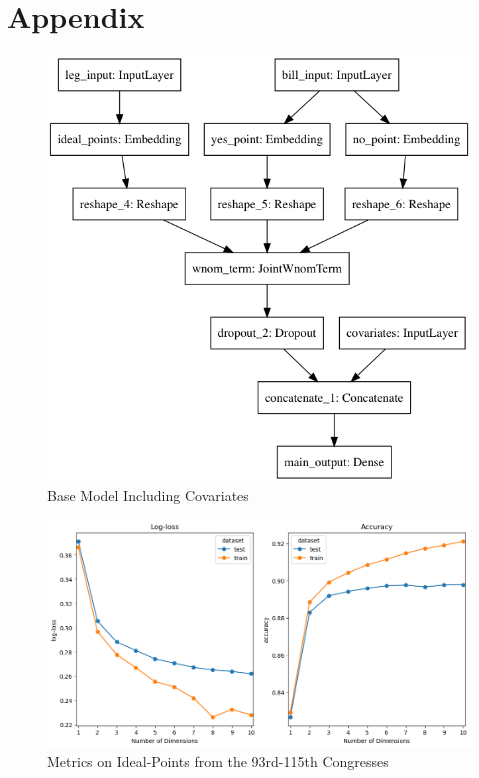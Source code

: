\documentclass[11pt,]{article}
\begin{document}
\section{Appendix}\label{appendix}

\appendix

\begin{figure}

{\centering \includegraphics[width=0.75\linewidth]{model_covariates}

}

\caption{\label{fig:modelcovariates}Base Model Including Covariates}\label{fig:unnamed-chunk-11}
\end{figure}

\begin{figure}

{\centering \includegraphics[width=1\linewidth]{93_votes_metrics}

}

\caption{\label{fig:93votesmetrics}Metrics on Ideal-Points from the 93rd-115th Congresses}\label{fig:unnamed-chunk-12}
\end{figure}
\end{document}
